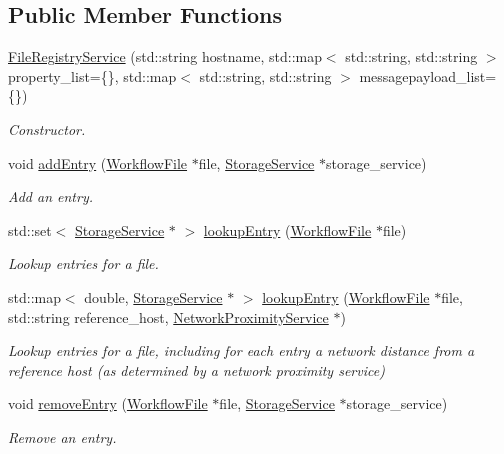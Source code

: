 \subsection*{Public Member Functions}
\begin{DoxyCompactItemize}
\item 
\hyperlink{classwrench_1_1_file_registry_service_ab5b1061fc26163f291e905c27bdbf114}{File\+Registry\+Service} (std\+::string hostname, std\+::map$<$ std\+::string, std\+::string $>$ property\+\_\+list=\{\}, std\+::map$<$ std\+::string, std\+::string $>$ messagepayload\+\_\+list=\{\})
\begin{DoxyCompactList}\small\item\em Constructor. \end{DoxyCompactList}\item 
void \hyperlink{classwrench_1_1_file_registry_service_a6c630119b5168fa84ea923217ee02243}{add\+Entry} (\hyperlink{classwrench_1_1_workflow_file}{Workflow\+File} $\ast$file, \hyperlink{classwrench_1_1_storage_service}{Storage\+Service} $\ast$storage\+\_\+service)
\begin{DoxyCompactList}\small\item\em Add an entry. \end{DoxyCompactList}\item 
std\+::set$<$ \hyperlink{classwrench_1_1_storage_service}{Storage\+Service} $\ast$ $>$ \hyperlink{classwrench_1_1_file_registry_service_a380277028177601cd601c8d8603d47f6}{lookup\+Entry} (\hyperlink{classwrench_1_1_workflow_file}{Workflow\+File} $\ast$file)
\begin{DoxyCompactList}\small\item\em Lookup entries for a file. \end{DoxyCompactList}\item 
std\+::map$<$ double, \hyperlink{classwrench_1_1_storage_service}{Storage\+Service} $\ast$ $>$ \hyperlink{classwrench_1_1_file_registry_service_a729671ba5d3f3d0da7f3e15058515aa7}{lookup\+Entry} (\hyperlink{classwrench_1_1_workflow_file}{Workflow\+File} $\ast$file, std\+::string reference\+\_\+host, \hyperlink{classwrench_1_1_network_proximity_service}{Network\+Proximity\+Service} $\ast$)
\begin{DoxyCompactList}\small\item\em Lookup entries for a file, including for each entry a network distance from a reference host (as determined by a network proximity service) \end{DoxyCompactList}\item 
void \hyperlink{classwrench_1_1_file_registry_service_a3e5d8d7503c2d3ad422b35c598647d82}{remove\+Entry} (\hyperlink{classwrench_1_1_workflow_file}{Workflow\+File} $\ast$file, \hyperlink{classwrench_1_1_storage_service}{Storage\+Service} $\ast$storage\+\_\+service)
\begin{DoxyCompactList}\small\item\em Remove an entry. \end{DoxyCompactList}\end{DoxyCompactItemize}
